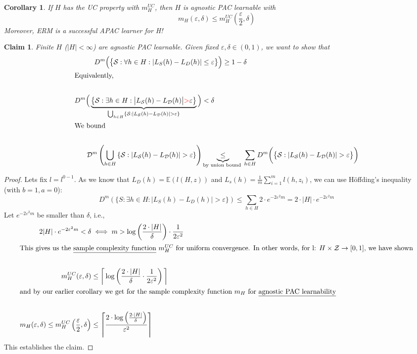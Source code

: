 \documentclass[10pt,a4paper]{article}
\newtheorem*{claim}{Claim}
\newtheorem{corollary}[theorem]{Corollary}
\theoremstyle{remark}
\theoremstyle{definition}
\theoremstyle{plain}
\begin{document}
\begin{corollary}
	If $H$ has the UC property with $m_H^{UC}$, then $H$ is agnostic PAC learnable with 
	$$ m_H(\varepsilon, \delta) \leq m_H^{UC}(\frac{\varepsilon}{2}, \delta)$$
	Moreover, ERM is a successful APAC learner for H!
\end{corollary}

\begin{claim}
	Finite $H$ ($|H|< \infty$) are agnostic PAC learnable.
	Given fixed $\varepsilon, \delta \in (0,1)$, we want to show that
	\begin{align*}
		D^{m}\Big(\big\{\mathcal{S}: \forall h \in H: \left|L_S(h) - L_D(h) \right| 
			&\leq \varepsilon\big\}\Big) \geq 1-\delta\\
		\intertext{Equivalently,}\\
		D^{m}\Big( \underbrace{ \big\{ \mathcal{S}: \exists h\in H: \big|L_\mathcal{S}(h)-L_\mathcal{D}(h)\big|\textcolor{red}{> }\varepsilon \big\}}_{\mathclap{\bigcup_{h \in H} \left\{\mathcal{S}: |L_\mathcal{S}(h)-L_\mathcal{D}(h) | > \varepsilon \right\}}} \Big)  
			&< \delta\\
		\intertext{We bound}\\
		\mathcal{D}^m \left( \bigcup_{h \in H} \left\{\mathcal{S}: |L_\mathcal{S}(h)-L_\mathcal{D}(h) | > \varepsilon \right\} \right) 
			&\underbrace{\leq}_{\smash{\text{by union bound }}} \sum_{h \in H} D^m\bigg( \big\{ \mathcal{S}: |L_\mathcal{S}(h)-L_\mathcal{D}(h) | > \varepsilon \big\}  \bigg)
	\end{align*}
\end{claim}

\begin{proof} Lets fix $ l = l^{0-1}$. As we know that $L_D(h) = \mathbb{E}(l(H, z))$ and $L_s(h) = \frac{1}{m} \sum_{i = 1}^{m} l(h, z_i)$, we can use Höffding's inequality (with $b = 1, a=0$): 
	$$D^{m}(\{ S: \exists h \in H: |L_S(h) - L_D(h)| > \varepsilon\}) \leq \sum_{h \in H} 2 \cdot e^{-2 \varepsilon^2 m} = 2 \cdot |H| \cdot  e^{-2 \varepsilon^2 m}$$
Let $e^{-2 \varepsilon^2 m}$ be smaller than $\delta$, i.e.,
	\begin{align*}
		2 |H| \cdot  e^{-2 \varepsilon^2 m} < \delta &\iff m > \log\left( \frac{2 \cdot |H|}{\delta}\right)\cdot \frac{1}{2 \varepsilon^2}\\
		\intertext{This gives us the \underline{sample complexity function} $m_{H}^{UC}$ for uniform convergence. In other words, for l: $H \times \mathcal{Z} \rightarrow [0,1]$, we have shown}\\
		m_H^{UC}(\varepsilon, \delta) &\leq \bigg\lceil \log \left(\frac{2 \cdot|H|}{\delta} \cdot \frac{1}{2 \varepsilon^2}\right) \bigg\rceil\\
		\intertext{and by our earlier corollary we get for the sample complexity function $m_{H}$ for \underline{agnostic PAC learnability}}\\
		m_H(\varepsilon, \delta) \leq m_H^{UC}\left(\frac{\varepsilon}{2}, \delta\right) &\leq \left\lceil \frac{2 \cdot \log\left(\frac{2\cdot |H|}{\delta}\right)}{\varepsilon^2} \right\rceil
	\end{align*}
This establishes the claim.
\newpage
\end{proof}
\end{document}
